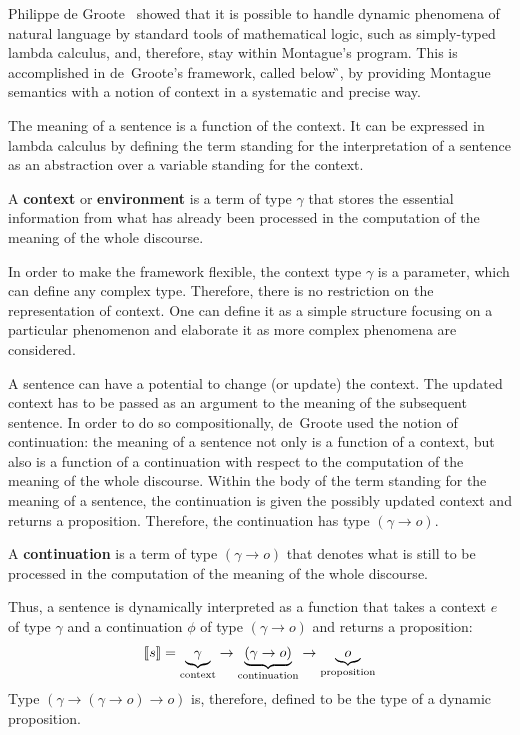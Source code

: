 Philippe de Groote~\cite{deGroote:2006:Towards-a-Montagovian-Account-of-Dynamics} showed that it is possible to handle dynamic phenomena of natural language by standard tools of mathematical logic, such as simply-typed lambda calculus, and, therefore, stay within Montague's program. This is accomplished in de~Groote's framework, called below {\G}, by providing Montague semantics with a notion of context in a systematic and precise way. 

The meaning of a sentence is a function of the context. It can be expressed in lambda calculus by defining the term standing for the interpretation of a sentence as an abstraction over a variable standing for the context. 

\begin{definition} A \textbf{context} or \textbf{environment} is a term of type $\gamma$ that stores the essential information from what has already been processed in the computation of the meaning of the whole discourse.
\end{definition}

In order to make the framework flexible, the context type $\gamma$ is a parameter, which can define any complex type. Therefore, there is no restriction on the representation of context. One can define it as a simple structure focusing on a particular phenomenon and elaborate it as more complex phenomena are considered.

A sentence can have a potential to change (or update) the context. The updated context has to be passed as an argument to the meaning of the subsequent sentence. In order to do so compositionally, de~Groote used the notion of continuation: the meaning of a sentence not only is a function of a context, but also is a function of a continuation with respect to the computation of the meaning of the whole discourse. Within the body of the term standing for the meaning of a sentence, the continuation is given the possibly updated context and returns a proposition. Therefore, the continuation has type $(\gamma \rightarrow o)$.
\begin{definition}[Continuation] A \textbf{continuation} is a term of type $(\gamma \rightarrow o)$ that denotes what is still to be processed in the computation of the meaning of the whole discourse. 
\end{definition}

Thus, a sentence is dynamically interpreted as a function that takes a context $e$ of type $\gamma$ and a continuation $\phi$ of type $(\gamma \rightarrow o)$ and returns a proposition: %
\begin{align}
[\![s]\!] = \underbrace{\gamma}_{\text{context}} \rightarrow \underbrace{(\gamma \rightarrow o)}_{\text{continuation}} \rightarrow \underbrace{o}_{
\text{proposition}} \notag
\end{align}
Type $(\gamma \rightarrow (\gamma \rightarrow o) \rightarrow o)$ is, therefore, defined to be the type of a dynamic proposition.
 
